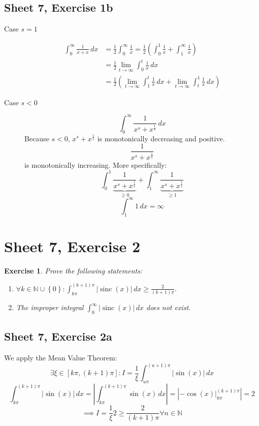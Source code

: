 \documentclass{article}
\newtheorem{ex}{Exercise} %
\newcommand{\set}[1]{\left\{#1\right\}}
\newcommand{\card}[1]{\left|#1\right|}
\begin{document}
\subsection{Sheet 7, Exercise 1b}
\begin{description}
  \item[Case $s = 1$]
    \begin{align*}
      \int_0^\infty \frac{1}{x + x} \, dx &= \frac12 \int_0^\infty \frac{1}{x} = \frac12 \left(\int_0^1 \frac1x + \int_1^\infty \frac1x\right) \\
        &= \frac12 \lim_{t\to\infty} \int_0^t \frac1x \, dx \\
        &= \frac12 \left(\lim_{t\to\infty} \int_1^t \frac1x \, dx + \lim_{t\to\infty} \int_t^1 \frac1x \, dx \right)
    \end{align*}
  \item[Case $s < 0$]
    \[ \int_0^\infty \frac{1}{x^s + x^{\frac1s}} \, dx \]
    Because $s < 0$, $x^s + x^{\frac1s}$ is monotonically decreasing and positive.
    \[ \frac{1}{x^s + x^{\frac1s}} \]
    is monotonically increasing.
    More specifically:
    \[ \int_0^1 \underbrace{\frac{1}{x^s + x^{\frac1s}}}_{\geq 0} + \int_1^\infty \underbrace{\frac{1}{x^s + x^{\frac1s}}}_{\geq 1} \]
    \[ \int_1^\infty 1 \, dx = \infty \]
\end{description}

\section{Sheet 7, Exercise 2}
\begin{ex}
  Prove the following statements:
  \begin{enumerate}
    \item $\forall k \in \mathbb N \cup \set{0}: \int_{k\pi}^{(k+1)\pi} \card{\operatorname{sinc}(x)} \, dx \geq \frac{2}{(k+1)\pi}$.
    \item The improper integral $\int_0^\infty \card{\operatorname{sinc}(x)} \, dx$ does not exist.
  \end{enumerate}
\end{ex}

\subsection{Sheet 7, Exercise 2a}

We apply the Mean Value Theorem:
\[ \exists \xi \in [k\pi, (k+1)\pi]: I = \frac1\xi \int_{u\pi}^{(u+1)\pi} \card{\sin(x)} \, dx \]
\[ \int_{k\pi}^{(k+1)\pi} \card{\sin(x)} \, dx = \card{\int_{k\pi}^{(k+1)\pi} \sin(x) \, dx} = \card{\left. -\cos(x) \right|_{k\pi}^{(k+1)\pi}} = 2 \]
\[ \implies I = \frac1\xi 2 \geq \frac{2}{(k+1)\pi} \forall n \in \mathbb N \]
\end{document}
